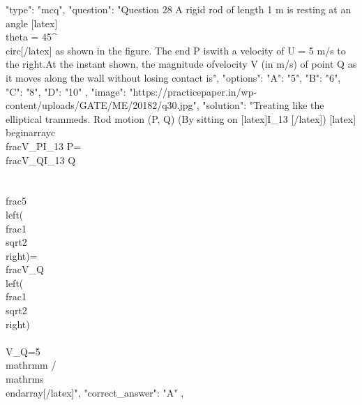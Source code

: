   {
    "type": "mcq",
    "question": "Question 28 A rigid rod of length 1 m is resting at an angle [latex]\\theta = 45^{\\circ}[/latex]  as shown in the figure. The end P is\ndragged with a velocity of  U = 5 m/s to the right.At the instant shown, the magnitude of\nthe velocity V (in m/s) of point Q as it moves along the wall without losing contact is",
    "options": {
      "A": "5",
      "B": "6",
      "C": "8",
      "D": "10"
    },
    "image": "https://practicepaper.in/wp-content/uploads/GATE/ME/20182/q30.jpg",
    "solution": "Treating like the elliptical trammeds. Rod motion (P, Q) (By sitting on [latex]I_{13} [/latex]) [latex] \\begin{array}{c} \\frac{V_{P}}{I_{13} P}=\\frac{V_{Q}}{I_{13} Q} \\\\ \\frac{5}{\\left(\\frac{1}{\\sqrt{2}}\\right)}=\\frac{V_{Q}}{\\left(\\frac{1}{\\sqrt{2}}\\right)} \\\\ V_{Q}=5 \\mathrm{m} / \\mathrm{s} \\end{array}[/latex]",
    "correct_answer": "A"
  },
